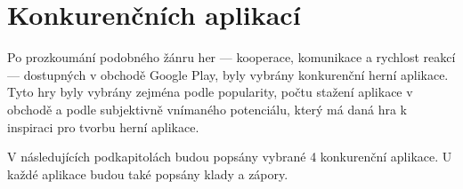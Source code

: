 \chapter{Konkurenčních aplikací}

Po prozkoumání podobného žánru her
--- kooperace, komunikace a rychlost reakcí ---
dostupných v obchodě Google Play,
byly vybrány konkurenční herní aplikace.
Tyto hry byly vybrány zejména podle popularity,
počtu stažení aplikace v obchodě
a podle subjektivně vnímaného potenciálu,
který má daná hra k inspiraci pro tvorbu herní aplikace.

V následujících podkapitolách budou popsány vybrané 4 konkurenční aplikace.
U každé aplikace budou také popsány klady a zápory.





